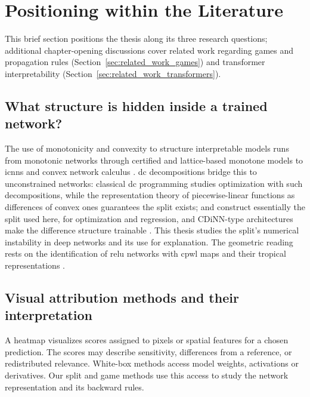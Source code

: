 \section{Positioning within the Literature}\label{sec:related_work}

This brief section positions the thesis along its three research questions; additional chapter-opening discussions cover related work regarding games and propagation rules (Section~\ref{sec:related_work_games}) and transformer interpretability (Section~\ref{sec:related_work_transformers}).

\subsection{What structure is hidden inside a trained network?}
The use of monotonicity and convexity to structure interpretable models runs from monotonic networks \parencite{Sill1997_MonotonicNetworks,Daniels2010_MonotoneNN} through certified and lattice-based monotone models \parencite{Liu2020CertifiedMonotone,Gupta2016MonotoneLattice,Sivaraman2020_COMET,Nguyen2023_MonoNet,Runje_2023} to \acp{icnn} \parencite{Amos2017} and convex network calculus \parencite{Bach2017ConvexNN,Calafiore2019DLSE,sivaprasad2021curious}. \ac{dc} decompositions bridge this to unconstrained networks: classical \ac{dc} programming \parencite{Tao1997_DCProgramming,LeThi2018DCA,Sriperumbudur2009CCCP} studies optimization with such decompositions, while the representation theory of piecewise-linear functions as differences of convex ones \parencite{Melzer1986_PLasDC,Kripfganz1987_PWAasDC,Zalgaller2000_DCRepresentation,Griewank2020_PolyhedralDCDecomposition,Schlueter2021_ConvexDecompPAF,Koutschan2024_MinimalArity,Kazda2024_LP_DCPLA,Brandenburg2025_DecompositionPolyhedra} guarantees the split exists; \textcite{Awasthi2023DCNN} and \textcite{Siahkamari2020_DCRegression} construct essentially the split used here, for optimization and regression, and CDiNN-type architectures make the difference structure trainable \parencite{Sankaranarayanan2021CDINN,Chen2025_RCDiNN}. This thesis studies the split's numerical instability in deep networks and its use for explanation. The geometric reading rests on the identification of \ac{relu} networks with \ac{cpwl} maps \parencite{Arora2018,BalestrieroBaraniuk2018MadMax,huchette2025deeplearningmeetspolyhedral} and their tropical representations \parencite{Zhang2018}.

\subsection{Visual attribution methods and their interpretation}\label{subsec:visual_attribution_related}
A heatmap visualizes scores assigned to pixels or spatial features for a chosen prediction. The scores may describe sensitivity, differences from a reference, or redistributed relevance. White-box methods access model weights, activations or derivatives. Our split and game methods use this access to study the network representation and its backward rules.


